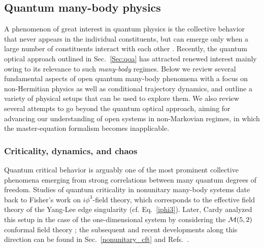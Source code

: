 \documentclass{tADP2e}
\theoremstyle{plain}
\theoremstyle{plain}
\theoremstyle{definition}
\begin{document}
\subsection{Quantum many-body physics}
\label{Sec:QMBP}
A phenomenon of great interest in quantum physics is the collective behavior that never appears in the individual constituents, but can emerge only when a large number of constituents interact with each other \cite{APW72}. 
Recently, the quantum optical approach outlined in Sec.~\ref{Sec:qoa} has attracted renewed interest mainly owing to its relevance to such {\it many-body} regimes. Below we review several fundamental aspects of open quantum many-body phenomena with a focus on non-Hermitian physics as well as conditional trajectory dynamics, and outline a variety of physical setups that can be used to explore  them.  We also  review several attempts to go beyond the quantum optical approach, aiming for advancing our understanding of open systems in non-Markovian regimes, in which the master-equation formalism becomes inapplicable. 

\subsubsection{Criticality, dynamics, and chaos\label{Sec:CDC}}
Quantum critical behavior is arguably one of the most prominent collective phenomena emerging from strong correlations between many quantum degrees of freedom. 
Studies of  quantum criticality in nonunitary many-body systems date back to Fisher's work \cite{MEF78} on $i\phi^3$-field theory, which corresponds to the effective field theory of the Yang-Lee edge singularity (cf. Eq.~\eqref{iphi3}). Later, Cardy analyzed this setup in the case of the one-dimensional system by considering the {${\cal M}(5,2)$} conformal field theory  \cite{JC85}; the subsequent and recent developments along this direction can be found in {Sec.~\ref{nonunitary_cft}} and Refs.~\cite{SAM19,SAM192,AJ20,AJ202,AJ19}. 
\end{document}
